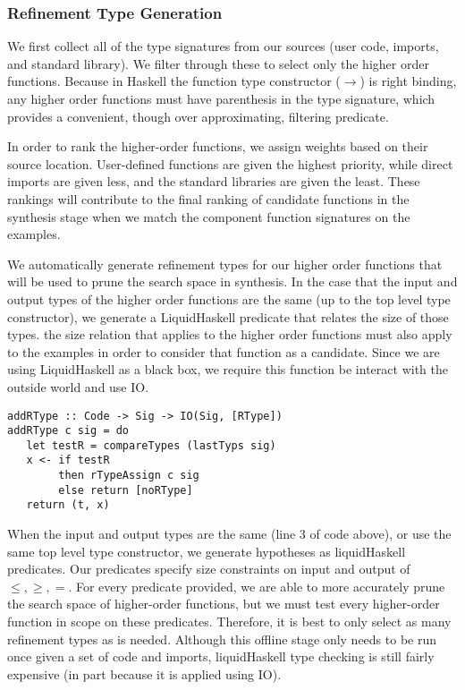 \subsubsection{Refinement Type Generation}

We first collect all of the type signatures from our sources (user code, imports, and standard library). We filter through these to select only the higher order functions. Because in Haskell the function type constructor ($\to$) is right binding, any higher order functions must have parenthesis in the type signature, which provides a convenient, though over approximating, filtering predicate.

In order to rank the higher-order functions, we assign weights based on their source location. User-defined functions are given the highest priority, while direct imports are given less, and the standard libraries are given the least. These rankings will contribute to the final ranking of candidate functions in the synthesis stage when we match the component function signatures on the examples.

We automatically generate refinement types for our higher order functions that will be used to prune the search space in synthesis.
In the case that the input and output types of the higher order functions are the same (up to the top level type constructor), we generate a LiquidHaskell predicate that relates the size of those types.
the size relation that applies to the higher order functions must also apply to the examples in order to consider that function as a candidate.   
Since we are using LiquidHaskell as a black box, we require this function be interact with the outside world and use IO.

\begin{lstlisting}
addRType :: Code -> Sig -> IO(Sig, [RType])
addRType c sig = do
   let testR = compareTypes (lastTyps sig)
   x <- if testR 
        then rTypeAssign c sig
        else return [noRType]
   return (t, x)
\end{lstlisting}


When the input and output types are the same (line 3 of code above), or use the same top level type constructor, we generate hypotheses as liquidHaskell predicates.
Our predicates specify size constraints on input and output of $\leq,\geq,=$.
For every predicate provided, we are able to more accurately prune the search space of higher-order functions, but we must test every higher-order function in scope on these predicates. 
Therefore, it is best to only select as many refinement types as is needed.
Although this offline stage only needs to be run once given a set of code and imports, liquidHaskell type checking is still fairly expensive (in part because it is applied using IO).

